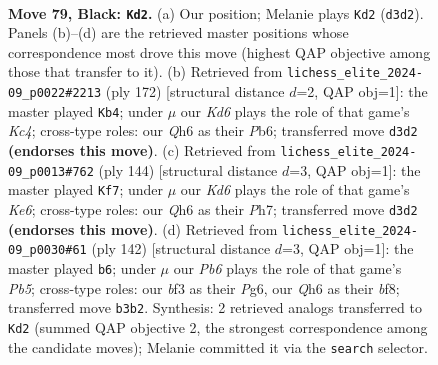 \documentclass[11pt]{article}
\begin{document}
\clearpage

\begin{figure}[p]\centering
\begin{subfigure}{0.46\textwidth}\centering
\resizebox{\linewidth}{!}{%
\newchessgame
\chessboard[
  setfen={8/8/7q/4b3/8/1p1k1B2/8/5K2 b - - 1 79},
  showmover=false,
  pgfstyle=straightmove, color=movearrow, markmove={d3-d2}
]}
\caption{}
\end{subfigure}\hfill
\begin{subfigure}{0.46\textwidth}\centering
\resizebox{\linewidth}{!}{%
\newchessgame
\chessboard[
  setfen={8/8/1P6/8/2K1b3/6B1/1k6/8 w - - 1 87},
  showmover=false,
  pgfstyle=straightmove, color=movearrow, markmove={c4-b4}
]}
\caption{}
\end{subfigure}
\\[4pt]
\begin{subfigure}{0.46\textwidth}\centering
\resizebox{\linewidth}{!}{%
\newchessgame
\chessboard[
  setfen={3k4/6bP/2B1K3/8/8/8/8/8 w - - 11 73},
  showmover=false,
  pgfstyle=straightmove, color=movearrow, markmove={e6-f7}
]}
\caption{}
\end{subfigure}\hfill
\begin{subfigure}{0.46\textwidth}\centering
\resizebox{\linewidth}{!}{%
\newchessgame
\chessboard[
  setfen={2B2b2/8/6P1/1P2k3/8/3K4/8/8 w - - 1 72},
  showmover=false,
  pgfstyle=straightmove, color=movearrow, markmove={b5-b6}
]}
\caption{}
\end{subfigure}
\caption{\textbf{Move 79, Black: \texttt{Kd2}.} (a) Our position; Melanie plays \texttt{Kd2} (\texttt{d3d2}). Panels (b)--(d) are the retrieved master positions whose correspondence most drove this move (highest QAP objective among those that transfer to it). (b) Retrieved from \texttt{lichess\_elite\_2024-09\_p0022\#2213} (ply 172) [structural distance $d$=2, QAP obj=1]: the master played \texttt{Kb4}; under $\mu$ our \emph{Kd6} plays the role of that game's \emph{Kc4}; cross-type roles: our \emph{Q}h6 as their \emph{P}b6; transferred move \texttt{d3d2} \textbf{(endorses this move)}. (c) Retrieved from \texttt{lichess\_elite\_2024-09\_p0013\#762} (ply 144) [structural distance $d$=3, QAP obj=1]: the master played \texttt{Kf7}; under $\mu$ our \emph{Kd6} plays the role of that game's \emph{Ke6}; cross-type roles: our \emph{Q}h6 as their \emph{P}h7; transferred move \texttt{d3d2} \textbf{(endorses this move)}. (d) Retrieved from \texttt{lichess\_elite\_2024-09\_p0030\#61} (ply 142) [structural distance $d$=3, QAP obj=1]: the master played \texttt{b6}; under $\mu$ our \emph{Pb6} plays the role of that game's \emph{Pb5}; cross-type roles: our \emph{b}f3 as their \emph{P}g6, our \emph{Q}h6 as their \emph{b}f8; transferred move \texttt{b3b2}. Synthesis: 2 retrieved analogs transferred to \texttt{Kd2} (summed QAP objective 2, the strongest correspondence among the candidate moves); Melanie committed it via the \texttt{search} selector.}
\label{fig:thought-m157}
\end{figure}
\end{document}
